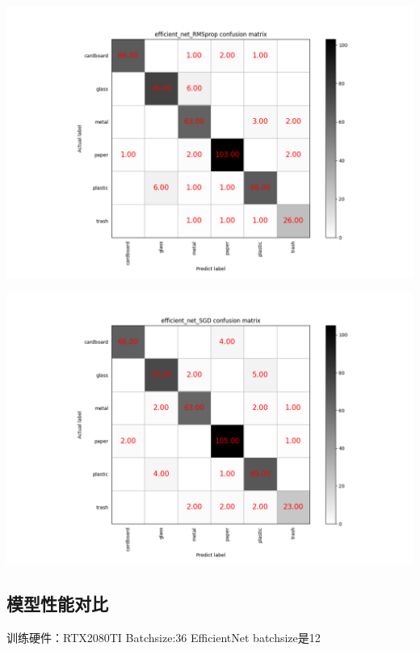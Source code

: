 \documentclass[UTF8]{ctexart}
\begin{document}
\includegraphics[scale=0.5]{cm/efficient_net_RMSprop.png} 

\includegraphics[scale=0.5]{cm/efficient_net_SGD.png} 

\subsection{模型性能对比}
训练硬件：RTX2080TI
Batchsize:36 EfficientNet batchsize是12
\end{document}
